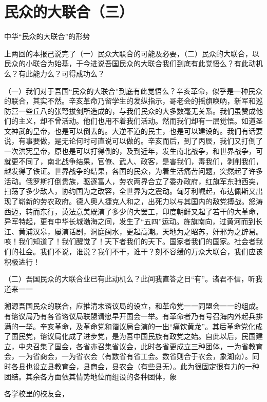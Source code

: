\section{民众的大联合（三）}



中华“民众的大联合”的形势

上两回的本报己说完了（一）民众大联合的可能及必要，（二）民众的大联合，以民众的小联合为始基，于今进说吾国民众的大联合我们到底有此觉悟么？有此动机么？有此能力么？可得成功么？

（一）我们对于吾国“民众的大联合”到底有此觉悟么？辛亥革命，似乎是一种民众的联合，其实不然。辛亥革命乃留学生的发纵指示，哥老会的摇旗唤吶，新军和巡防营一些丘八的张弩拔剑所造成的，与我们民众的大多数毫无关系。我们虽赞成他们的主义，却不曾活动。他们也用不着我们活动。然而我们却有一层觉悟。如道圣文神武的皇帝，也是可以倒去的。大逆不道的民主，也是可以建设的。我们有话要说，有事要做，是无论何时可直说可以做的。辛亥而后，到了丙辰，我们又打倒了一次洪宪皇帝，原也是可以打得倒的，及到近年，发生南北战争，和世界战争，可就更不同了，南北战争结果，官僚、武人、政客，是害我们，毒我们，剥削我们，越发得了铁证。世界战争的结果，各国的民众，为着生活痛苦问题，突然起了许多活动。俄罗斯打倒贵族，驱逐富人，劳农两界合立了委办政府，红旗军东驰西突，扫荡了多少敌人，协约国为之改容，全世界为之震动。匈牙利崛起，布达佩斯又出现了崭新的劳农政府。德人奥人捷克人和之，出死力以与其国内的敌党搏战。怒涛西迈，转而东行，英法意美既演了多少的大罢工，印度朝鲜又起了若干的大革命，异军特起，更有中华长城渤海之间，发生了“五四”运动。旌旗南向，过黄河而到长江、黄浦汉皋，屡演话剧，洞庭闽水，更起高潮。天地为之昭苏，奸邪为之辟易。咳！我们知道了！我们醒觉了！天下者我们的天下。国家者我们的国家。社会者我们的社会。我们不说，谁说？我们不干，谁干？刻不容缓的万众大联合，我们应该积极进行！

（二）吾国民众的大联合业已有此动机么？此间我直答之日“有”。诸君不信，听我道来一一

溯源吾国民众的联合，应推清末谘议局的设立，和革命党一一同盟会一一的组成。有谘议局乃有各省谘议局联盟请愿早开国会一举。有革命者乃有号召海内外起兵排满的一举。辛亥革命，及革命党和谐议局合演的一出“痛饮黄龙”。其后革命党化成了国民党，谘议局化成了进步党，是为吾中国民族有政党之始。自此以后，民国建立，中央召集了国会，各省亦召集省议会，此时各省更成立三种团体，一为省教育会，一为省商会，一为省农会（有数省有省工会。数省则合于农会，象湖南）。同时各县也设立县教育会，县商会，县农会（有些县无）。此为很固定很有力的一种团结。其余各方面依其情势地位而组设的各种团体，象

各学校里的校友会，


